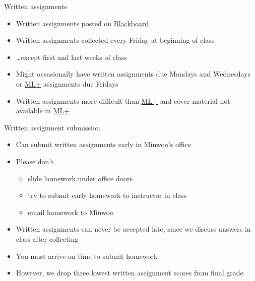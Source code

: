 \documentclass[xcolor=dvipsnames]{beamer}
\theoremstyle{definition}
\begin{document}
\begin{frame}{Written assignments}
\begin{itemize}
\item Written assignments posted on
\href{https://bb.its.iastate.edu}{\color{blue} Blackboard}
\item Written assignments collected \alert{every Friday}
at \alert{beginning} of class
\item \dots except first and last weeks of class
\item Might occasionally have written assignments
due Mondays and Wednesdays or
\href{http://iastate.mylabsplus.com}{\color{blue}ML+}
assignments due Fridays
\item Written assignments more difficult than 
\href{http://iastate.mylabsplus.com}{\color{blue}ML+}
and cover material not available in
\href{http://iastate.mylabsplus.com}{\color{blue}ML+}
\end{itemize}
\end{frame}

\begin{frame}{Written assignment submission}
\begin{itemize}
\item Can submit written assignments early in Minwoo's office
\item Please don't
\begin{itemize}
\item slide homework under office doors
\item try to submit early homework to instructor in class
\item email homework to Minwoo
\end{itemize}
\item Written assignments can \alert{never} be accepted late,
since we discuss answers in class after collecting
\item You must arrive on time to submit homework
\item However, we drop three lowest written assignment scores from final grade
\end{itemize}
\end{frame}
\end{document}
